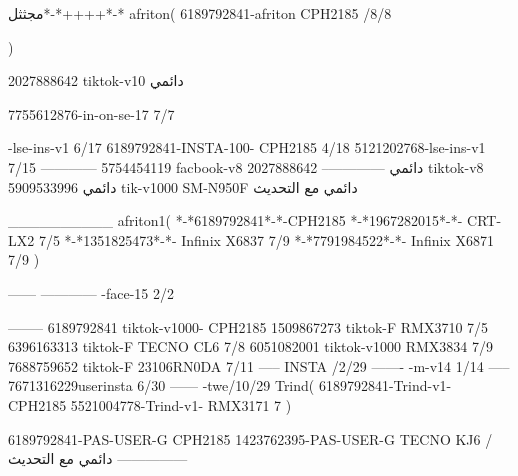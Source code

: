 مجثثل*-*++++*-*
afriton(
6189792841-afriton CPH2185  /8/8

)

2027888642 tiktok-v10
دائمي

7755612876-in-on-se-17 7/7

-lse-ins-v1 6/17
6189792841-INSTA-100- CPH2185 4/18
5121202768-lse-ins-v1 7/15
------------
5754454119 facbook-v8
دائمي
--------------
2027888642 tiktok-v8
دائمي
5909533996 tik-v1000  SM-N950F
دائمي مع التحديث

__________
afriton1(
*-*6189792841*-*-CPH2185
*-*1967282015*-*-  CRT-LX2  7/5
*-*1351825473*-*-  Infinix X6837  7/9
*-*7791984522*-*-  Infinix X6871  7/9
)


------
------------
-face-15 2/2

--------
6189792841 tiktok-v1000- CPH2185 
1509867273 tiktok-F RMX3710  7/5
6396163313 tiktok-F TECNO CL6  7/8
6051082001 tiktok-v1000 RMX3834  7/9
7688759652 tiktok-F 23106RN0DA  7/11
-----
 INSTA /2/29
-------
-m-v14 1/14
-----
7671316229userinsta 6/30
------
-twe/10/29
Trind(
6189792841-Trind-v1- CPH2185 
5521004778-Trind-v1- RMX3171 7
)


6189792841-PAS-USER-G CPH2185 
1423762395-PAS-USER-G TECNO KJ6  /دائمي مع التحديث
    ---------------
